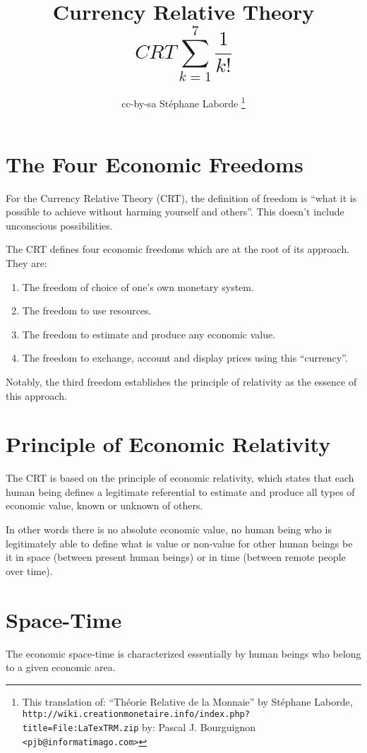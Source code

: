 \documentclass[a4paper,oneside,12pt]{article}
\title{Currency Relative Theory \\
\begin{displaymath}CRT \sum_{k=1}^{7}\frac{1}{k!}\end{displaymath}}
\author{
  cc-by-sa Stéphane Laborde 
  \footnote{\small This translation of: 
``Théorie Relative de la Monnaie'' by Stéphane Laborde, 
\texttt{http://wiki.creationmonetaire.info/index.php?title=File:LaTexTRM.zip}
by: Pascal J. Bourguignon \texttt{<pjb@informatimago.com>} }
}
\begin{document}
\maketitle
\newpage
\tableofcontents
\newpage

\section{The Four Economic Freedoms}

For the Currency Relative Theory (CRT), the definition of freedom is
``what it is possible to achieve without harming yourself and
others''.  This doesn't include unconscious possibilities.

The CRT defines four economic freedoms which are at the root of its
approach.  They are:


\begin{enumerate}
\item The freedom of choice of one's own monetary system.
\item The freedom to use resources.
\item The freedom to estimate and produce any economic value.
\item The freedom to exchange, account and display prices using this ``currency''.
\end{enumerate}

Notably, the third freedom establishes the principle of relativity as
the essence of this approach. 


\section{Principle of Economic Relativity}

The CRT is based on the principle of economic relativity, which states
that each human being defines a legitimate referential to estimate and
produce all types of economic value, known or unknown of others. 

In other words there is no absolute economic value, no human being who
is legitimately able to define what is value or non-value for other
human beings be it in space (between present human beings) or in time
(between remote people over time). 


\section{Space-Time}

The economic space-time is characterized essentially by human beings
who belong to a given economic area.
\end{document}
